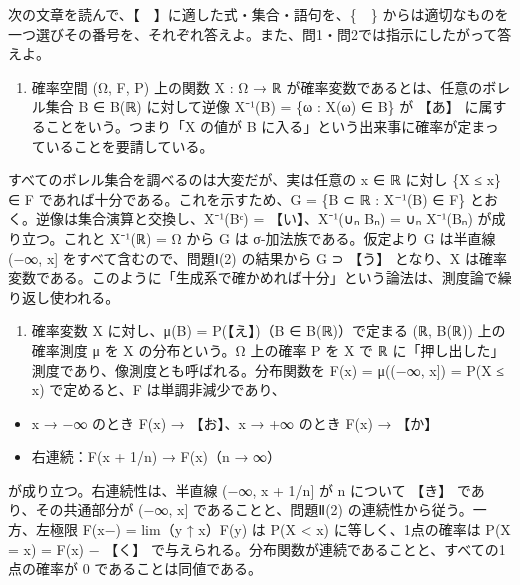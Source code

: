 \documentclass[
  10pt,
  a4paper,
]{article}
\providecommand{\tightlist}{%
  \setlength{\itemsep}{0pt}\setlength{\parskip}{0pt}}
\begin{document}
次の文章を読んで、【　】に適した式・集合・語句を、\{　\}
からは適切なものを一つ選びその番号を、それぞれ答えよ。また、問1・問2では指示にしたがって答えよ。

\begin{enumerate}
\def\labelenumi{(\arabic{enumi})}
\tightlist
\item
  確率空間 (Ω, F, P) 上の関数 X : Ω → {\fallbackfont ℝ}
  が確率変数であるとは、任意のボレル集合 B ∈ B({\fallbackfont ℝ})
  に対して逆像 X{\fallbackfont ⁻}¹(B) = \{ω : X(ω) ∈ B\} が 【あ】
  に属することをいう。つまり「X の値が B
  に入る」という出来事に確率が定まっていることを要請している。
\end{enumerate}

すべてのボレル集合を調べるのは大変だが、実は任意の x ∈ {\fallbackfont ℝ}
に対し \{X ≤ x\} ∈ F であれば十分である。これを示すため、G = \{B ⊂
{\fallbackfont ℝ} : X{\fallbackfont ⁻}¹(B) ∈ F\}
とおく。逆像は集合演算と交換し、X{\fallbackfont ⁻}¹(B{\fallbackfont ᶜ})
= 【い】、X{\fallbackfont ⁻}¹(∪{\fallbackfont ₙ} B{\fallbackfont ₙ}) =
∪{\fallbackfont ₙ} X{\fallbackfont ⁻}¹(B{\fallbackfont ₙ})
が成り立つ。これと X{\fallbackfont ⁻}¹({\fallbackfont ℝ}) = Ω から G は
σ-加法族である。仮定より G は半直線 (−∞, x{]} をすべて含むので、問題Ⅰ(2)
の結果から G ⊃ 【う】 となり、X
は確率変数である。このように「生成系で確かめれば十分」という論法は、測度論で繰り返し使われる。

\begin{enumerate}
\def\labelenumi{(\arabic{enumi})}
\setcounter{enumi}{1}
\tightlist
\item
  確率変数 X に対し、μ(B) = P(【え】)（B ∈
  B({\fallbackfont ℝ})）で定まる ({\fallbackfont ℝ},
  B({\fallbackfont ℝ})) 上の確率測度 μ を X の分布という。Ω 上の確率 P
  を X で {\fallbackfont ℝ}
  に「押し出した」測度であり、像測度とも呼ばれる。分布関数を F(x) =
  μ((−∞, x{]}) = P(X ≤ x) で定めると、F は単調非減少であり、
\end{enumerate}

\begin{itemize}
\tightlist
\item
  x → −∞ のとき F(x) → 【お】、x → +∞ のとき F(x) → 【か】
\item
  右連続：F(x + 1/n) → F(x)（n → ∞）
\end{itemize}

が成り立つ。右連続性は、半直線 (−∞, x + 1/n{]} が n について 【き】
であり、その共通部分が (−∞, x{]} であることと、問題Ⅱ(2)
の連続性から従う。一方、左極限 F(x−) = lim（y ↑ x）F(y) は P(X
\textless{} x) に等しく、1点の確率は P(X = x) = F(x) − 【く】
で与えられる。分布関数が連続であることと、すべての1点の確率が 0
であることは同値である。
\end{document}
